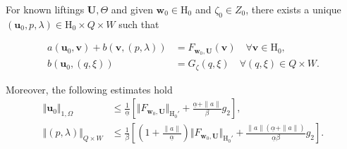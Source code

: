 \documentclass[onefignum,onetabnum,reqno,a4paper,final]{siamart250211}
\def\O{\Omega}
\newcommand\bu{\boldsymbol{u}}
\newcommand\bv{\boldsymbol{v}}
\newcommand\bw{\boldsymbol{w}}
\newcommand\0{\mathbf{0}}
\newcommand\bU{\boldsymbol{U}}
\newcommand\bH{\boldsymbol{\mathrm{H}}}
\renewcommand\O{\Omega}
\numberwithin{figure}{section}
\numberwithin{table}{section}
\begin{document}
\begin{lemma}\label{lem:stokes}
    For known liftings $\bU, \Theta$ and given $\bw_0\in\bH_0$ and $\zeta_0\in Z_0$, there exists a unique $(\bu_0,p,\lambda)\in\bH_0\times Q\times W$ such that
 \begin{linenomath}
 	\begin{subequations}
 		\begin{align}
 			\label{eq:104a}   a(\bu_0,\bv)  + b(\bv,(p,\lambda)) & = F_{\bw_0,\bU}(\bv) \quad \forall \bv \in \bH_0,\\
 			\label{eq:104b}    b(\bu_0,(q,\xi)) & = G_\zeta(q,\xi) \quad \forall (q,\xi)\in Q\times W.
 		\end{align}
 \end{subequations}\end{linenomath}
Moreover, the following estimates hold  
\begin{subequations}\begin{align}
	\label{eq:107}
	\Vert\bu_0\Vert_{1,\O}&\leq \frac{1}{\underline{\alpha}}\left[\Vert F_{\bw_0,\bU}\Vert_{\bH_0'} +\frac{\underline{\alpha}+\|a\|}{\beta}g_2\right],\\
	\label{eq:108}
	\Vert(p,\lambda)\Vert_{Q\times W}&\leq\frac{1}{\beta}\left[\left(1+\frac{\|a\|}{\underline{\alpha}}\right)
 \Vert F_{\bw_0,\bU}\Vert_{\bH_0'} 
 +\frac{\|a\|(\underline{\alpha}+\|a\|)}{\underline{\alpha}\beta}g_2\right].
\end{align}\end{subequations}
\end{lemma}
\end{document}
